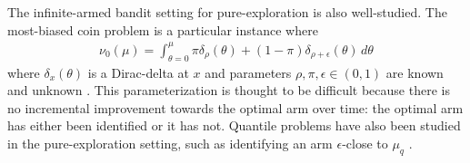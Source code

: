 The infinite-armed bandit setting for pure-exploration is also well-studied. 
The most-biased coin problem is a particular instance where 
\begin{align}\label{eqn:mostbiasedcoin_reservoir}
\nu_0(\mu) = \int_{\theta=0}^\mu \pi \delta_{\rho}(\theta) + (1-\pi) \delta_{\rho+\epsilon}(\theta) \, d\theta
\end{align} 
where $\delta_{x}(\theta)$ is a Dirac-delta at $x$ and parameters $\rho,\pi,\epsilon \in (0,1)$ are known \citep{chandrasekaran2014finding,malloy2012quickest} and unknown \citep{jamieson2016power}.
This parameterization is thought to be difficult because there is no incremental improvement towards the optimal arm over time: the optimal arm has either been identified or it has not. 
Quantile problems have also been studied in the pure-exploration setting, such as identifying an arm $\epsilon$-close to $\mu_q$ \citep{chaudhuri2017pac,aziz2018pure,ren2018exploring}.



